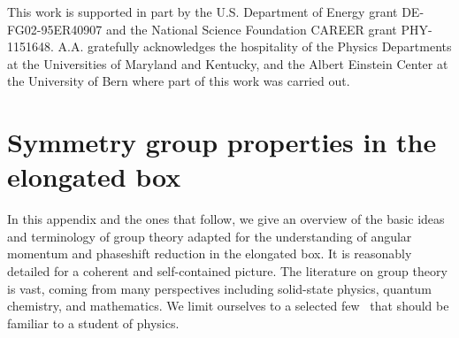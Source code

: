 \documentclass[aps,prd,reprint,showpacs,floatfix,longbibliography,,superscriptaddress]{revtex4-1}
\begin{document}
\begin{widetext}
%
%


\acknowledgements

This work is supported in part by the U.S. Department of Energy grant DE-FG02-95ER40907 and the National Science Foundation CAREER grant PHY-1151648. 
A.A. gratefully acknowledges 
the hospitality of the Physics Departments at the Universities of Maryland and Kentucky, 
and the Albert Einstein Center at the University of Bern where part
of this work was carried out.

\appendix


\newpage
\section{Symmetry group properties in the elongated box}
\label{app:elongated}

In this appendix and the ones that follow, we give an overview of the basic ideas and terminology of group theory 
adapted for the understanding of angular momentum and phaseshift reduction in the elongated box.
It is reasonably detailed for a coherent and self-contained picture.
The literature on group theory is vast, coming from many perspectives including solid-state physics, quantum chemistry, and mathematics.
We limit ourselves to a selected few~\cite{Tinkham:1992,Johnson:1982,Moore:2005dw,Altmann:1986,Altmann:1994,Chen:2002} that 
should be familiar to a student of physics.


\end{widetext}
\end{document}
